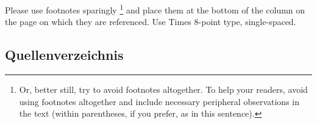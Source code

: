 \documentclass[
10pt,			%
paper=a4,		%
ngerman,		%
BCOR=0pt,		%
DIV=calc,		%
headinclude,	%
headsepline,	%
numbers=noenddot,
twocolumn,
]{article}
\begin{document}
Please use footnotes sparingly%
\footnote
   {%
     Or, better still, try to avoid footnotes altogether.  To help your 
     readers, avoid using footnotes altogether and include necessary 
     peripheral observations in the text (within parentheses, if you 
     prefer, as in this sentence).
   }
and place them at the bottom of the column on the page on which they are 
referenced. Use Times 8-point type, single-spaced.


\subsection{Quellenverzeichnis}



\end{document}
